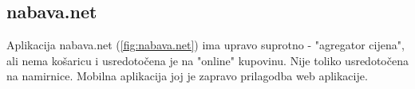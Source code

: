     
    \subsection{nabava.net}
    
    Aplikacija nabava.net (\ref{fig:nabava.net}) ima upravo suprotno - "agregator cijena", ali nema košaricu i usredotočena je na "online" kupovinu. Nije toliko usredotočena na namirnice. Mobilna aplikacija joj je zapravo prilagodba web aplikacije.
    
        
        \eject
        
    
